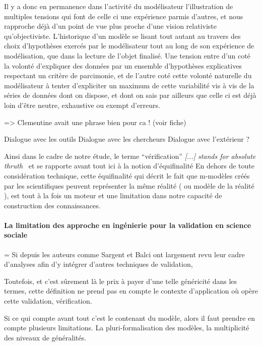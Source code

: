 Il y a donc en permanence dans l'activité du modélisateur l'illustration de multiples tensions qui font de celle ci une expérience parmis d'autres, et nous rapproche déjà d'un point de vue plus proche d'une vision relativiste qu'objectiviste. L'historique d'un modèle se lisant tout autant au travers des choix d'hypothèses exercés par le modélisateur tout au long de son expérience de modélisation, que dans la lecture de l'objet finalisé. Une tension entre d'un coté la volonté d'expliquer des données par un ensemble d'hypothèses explicatives respectant un critère de parcimonie, et de l'autre coté cette volonté naturelle du modélisateur à tenter d'expliciter un maximum de cette variabilité vis à vis de la séries de données dont on dispose, et dont on sais par ailleurs que celle ci est déjà loin d'être neutre, exhaustive ou exempt d'erreurs.

=> Clementine avait une phrase bien pour ca ! (voir fiche)

Dialogue avec les outils
Dialogue avec les chercheurs
Dialogue avec l'extérieur
?

Ainsi dans le cadre de notre étude, le terme \enquote{vérification}  \textit{[...] stands for absolute thruth } \autocite{David2009} \autocite{Oreskes1994} et se rapporte avant tout ici à la notion d'équifinalité \autocite{OSullivan2004} En dehors de toute considération technique, cette équifinalité qui décrit le fait que m-modèles créés par les scientifiques peuvent représenter la même réalité ( ou modèle de la réalité ), est tout à la fois un moteur et une limitation dans notre capacité de construction des connaissances. 


\paragraph{La limitation des approche en ingénierie pour la validation en science sociale}

= Si depuis les auteurs comme Sargent et Balci ont largement revu leur cadre d'analyses afin d'y intégrer d'autres techniques de validation, 

Toutefois, et c'est sûrement là le prix à payer d'une telle généricité dans les termes, cette définition ne prend pas en compte le contexte d'application où opère cette validation, vérification. 

Si ce qui compte avant tout c'est le contenant du modèle, alors il faut prendre en compte plusieurs limitations. La pluri-formalisation des modèles, la multiplicité des niveaux de généralités.

